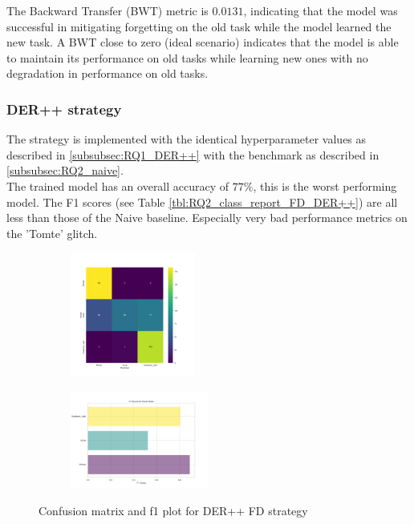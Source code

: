 The Backward Transfer (BWT) metric is $0.0131$, indicating that the model was successful in mitigating forgetting on the old task while the model learned the new task. A BWT close to zero (ideal scenario) indicates that the model is able to maintain its performance on old tasks while learning new ones with no degradation in performance on old tasks.


\subsubsection{DER++ strategy}
\label{subsubsec:RQ2_der++}
The strategy is implemented with the identical hyperparameter values as described in \ref{subsubsec:RQ1_DER++} with the benchmark as described in \ref{subsubsec:RQ2_naive}. \\
The trained model has an overall accuracy of $77\%$, this is the worst performing model. The F1 scores (see Table \ref{tbl:RQ2_class_report_FD_DER++}) are all less than those of the Naive baseline. Especially very bad performance metrics on the 'Tomte' glitch. 
\begin{figure}[!ht]
\centering
\begin{subfigure}
  \centering
  \includegraphics[width=0.45\textwidth]{Images/cm_FD_model_DER++.png}  
  \label{fig:fd_sub-first}
\end{subfigure}
\begin{subfigure}
  \centering
  \includegraphics[width=0.50\textwidth]{Images/f1_FD_model_DER++.png}  
  \label{fig:fd_sub-second}
\end{subfigure}
\caption{Confusion matrix and f1 plot for DER++ FD strategy}
\label{fig:cm_f1_FD_DER++}
\end{figure}

